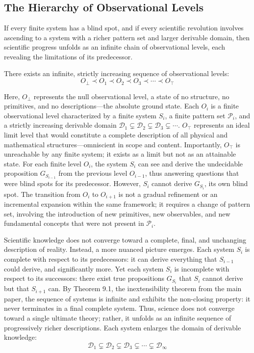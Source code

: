 \documentclass[11pt]{article}
\begin{document}
\subsection{The Hierarchy of Observational Levels}
\label{subsec:hierarchy}

If every finite system has a blind spot, and if every scientific revolution involves ascending to a system with a richer pattern set and larger derivable domain, then scientific progress unfolds as an infinite chain of observational levels, each revealing the limitations of its predecessor.

There exists an infinite, strictly increasing sequence of observational levels:
\begin{equation}
O_\perp \prec O_1 \prec O_2 \prec O_3 \prec \cdots \prec O_\top
\end{equation}

Here, $O_\perp$ represents the null observational level, a state of no structure, no primitives, and no descriptions—the absolute ground state. Each $O_i$ is a finite observational level characterized by a finite system $S_i$, a finite pattern set $\mathcal{P}_i$, and a strictly increasing derivable domain $\mathcal{D}_1 \subsetneq \mathcal{D}_2 \subsetneq \mathcal{D}_3 \subsetneq \cdots$. $O_\top$ represents an ideal limit level that would constitute a complete description of all physical and mathematical structures—omniscient in scope and content. Importantly, $O_\top$ is unreachable by any finite system; it exists as a limit but not as an attainable state. For each finite level $O_i$, the system $S_i$ can see and derive the undecidable proposition $G_{S_{i-1}}$ from the previous level $O_{i-1}$, thus answering questions that were blind spots for its predecessor. However, $S_i$ cannot derive $G_{S_i}$, its own blind spot. The transition from $O_i$ to $O_{i+1}$ is not a gradual refinement or an incremental expansion within the same framework; it requires a change of pattern set, involving the introduction of new primitives, new observables, and new fundamental concepts that were not present in $\mathcal{P}_i$.

Scientific knowledge does not converge toward a complete, final, and unchanging description of reality. Instead, a more nuanced picture emerges. Each system $S_i$ is complete with respect to its predecessors: it can derive everything that $S_{i-1}$ could derive, and significantly more. Yet each system $S_i$ is incomplete with respect to its successors: there exist true propositions $G_{S_i}$ that $S_i$ cannot derive but that $S_{i+1}$ can. By Theorem 9.1, the inextensibility theorem from the main paper, the sequence of systems is infinite and exhibits the non-closing property: it never terminates in a final complete system. Thus, science does not converge toward a single ultimate theory; rather, it unfolds as an infinite sequence of progressively richer descriptions. Each system enlarges the domain of derivable knowledge:
\begin{equation}
\mathcal{D}_1 \subsetneq \mathcal{D}_2 \subsetneq \mathcal{D}_3 \subsetneq \cdots \subsetneq \mathcal{D}_\infty
\end{equation}
\end{document}
